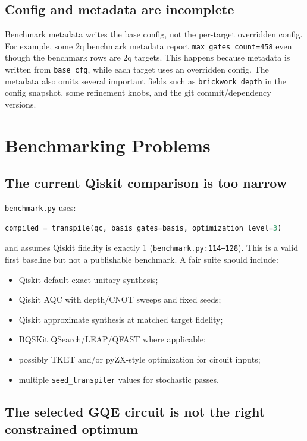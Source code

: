 \documentclass[11pt,a4paper]{article}
\begin{document}
\subsection{Config and metadata are incomplete}

Benchmark metadata writes the base config, not the per-target overridden config.
For example, some 2q benchmark metadata report \texttt{max\_gates\_count=458}
even though the benchmark rows are 2q targets. This happens because metadata is
written from \texttt{base\_cfg}, while each target uses an overridden config.
The metadata also omits several important fields such as
\texttt{brickwork\_depth} in the config snapshot, some refinement knobs, and
the git commit/dependency versions.

\section{Benchmarking Problems}

\subsection{The current Qiskit comparison is too narrow}

\texttt{benchmark.py} uses:
\begin{lstlisting}[language=Python]
compiled = transpile(qc, basis_gates=basis, optimization_level=3)
\end{lstlisting}
and assumes Qiskit fidelity is exactly 1
(\texttt{benchmark.py:114--128}). This is a valid first baseline but not a
publishable benchmark. A fair suite should include:
\begin{itemize}[leftmargin=2em]
  \item Qiskit default exact unitary synthesis;
  \item Qiskit AQC with depth/CNOT sweeps and fixed seeds;
  \item Qiskit approximate synthesis at matched target fidelity;
  \item BQSKit QSearch/LEAP/QFAST where applicable;
  \item possibly TKET and/or pyZX-style optimization for circuit inputs;
  \item multiple \texttt{seed\_transpiler} values for stochastic passes.
\end{itemize}

\subsection{The selected GQE circuit is not the right constrained optimum}
\end{document}
